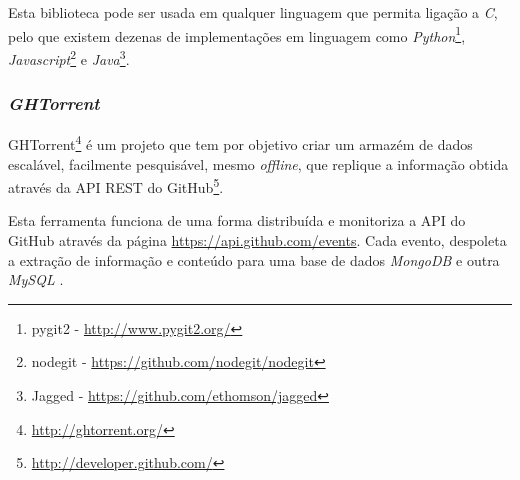 Esta biblioteca pode ser usada em qualquer linguagem que permita ligação a \emph{C}, pelo que existem dezenas de implementações em linguagem como \emph{Python}\footnote{pygit2 - \url{http://www.pygit2.org/}}, \emph{Javascript}\footnote{nodegit - \url{https://github.com/nodegit/nodegit}} e \emph{Java}\footnote{Jagged - \url{https://github.com/ethomson/jagged}}.

\subsubsection{\emph{GHTorrent}}

GHTorrent\footnote{\url{http://ghtorrent.org/}} é um projeto que tem por objetivo criar um armazém de dados escalável, facilmente pesquisável, mesmo \emph{offline}, que replique a informação obtida através da API REST do GitHub\footnote{\url{http://developer.github.com/}}.

Esta ferramenta funciona de uma forma distribuída e monitoriza a API do GitHub através da página \url{https://api.github.com/events}. Cada evento, despoleta a extração de informação e conteúdo para uma base de dados \emph{MongoDB} e outra \emph{MySQL} \cite{Gousios2012}.
